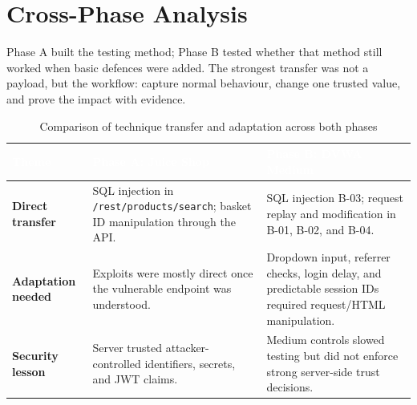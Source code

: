 \documentclass[11pt,a4paper]{report}
\begin{document}
    \newpage

    \chapter{Cross-Phase Analysis}

        \begin{tcolorbox}[
            colback=lightgray,
            colframe=headerblack,
            title=\textbf{Cross-Phase View},
            arc=1mm,
            boxrule=0.8pt
        ]
        Phase A built the testing method; Phase B tested whether that method still worked when basic defences were added. The strongest transfer was not a payload, but the workflow: capture normal behaviour, change one trusted value, and prove the impact with evidence.
        \end{tcolorbox}

        \vspace{0.25cm}

        \begin{table}[H]
        \centering
        \renewcommand{\arraystretch}{1.55}
        \begin{tabular}{|p{3.1cm}|p{5.0cm}|p{5.0cm}|}
        \hline
        \rowcolor{black!85}
        \textcolor{white}{\textbf{Theme}} &
        \textcolor{white}{\textbf{Phase A: Juice Shop}} &
        \textcolor{white}{\textbf{Phase B: DVWA Medium}} \\
        \hline
        \cellcolor{blue!10}\textbf{Direct transfer} &
        SQL injection in \texttt{/rest/products/search}; basket ID manipulation through the API. &
        SQL injection B-03; request replay and modification in B-01, B-02, and B-04. \\
        \hline
        \cellcolor{orange!15}\textbf{Adaptation needed} &
        Exploits were mostly direct once the vulnerable endpoint was understood. &
        Dropdown input, referrer checks, login delay, and predictable session IDs required request/HTML manipulation. \\
        \hline
        \cellcolor{red!10}\textbf{Security lesson} &
        Server trusted attacker-controlled identifiers, secrets, and JWT claims. &
        Medium controls slowed testing but did not enforce strong server-side trust decisions. \\
        \hline
        \end{tabular}
        \caption{Comparison of technique transfer and adaptation across both phases}
        \end{table}
\end{document}

